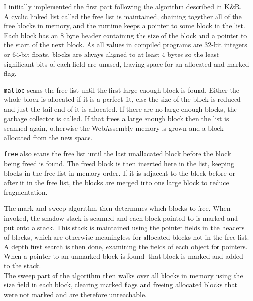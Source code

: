I initially implemented the first part following the algorithm described in K\&R\nocite{k_and_r}. A cyclic linked list called the free list is maintained, chaining together all of the free blocks in memory, and the runtime keeps a pointer to some block in the list. Each block has an 8 byte header containing the size of the block and a pointer to the start of the next block. %
As all values in compiled programs are 32-bit integers or 64-bit floats, blocks are always aligned to at least 4 bytes so the least significant bits of each field are unused, leaving space for an allocated and marked flag. 

\verb|malloc| scans the free list until the first large enough block is found. Either the whole block is allocated if it is a perfect fit, else the size of the block is reduced and just the tail end of it is allocated. If there are no large enough blocks, the garbage collector is called. If that frees a large enough block then the list is scanned again, otherwise the WebAssembly memory is grown and a block allocated from the new space.


\verb|free| also scans the free list until the last unallocated block before the block being freed is found. The freed block is then inserted here in the list, keeping blocks in the free list in memory order. If it is adjacent to the block before or after it in the free list, the blocks are merged into one large block to reduce fragmentation.

The mark and sweep algorithm then determines which blocks to free. When invoked, the shadow stack is scanned and each block pointed to is marked and put onto a stack. This stack is maintained using the pointer fields in the headers of blocks, which are otherwise meaningless for allocated blocks not in the free list. A depth first search is then done, examining the fields of each object for pointers. When a pointer to an unmarked block is found, that block is marked and added to the stack. \\
The sweep part of the algorithm then walks over all blocks in memory using the size field in each block, clearing marked flags and freeing allocated blocks that were not marked and are therefore unreachable.

